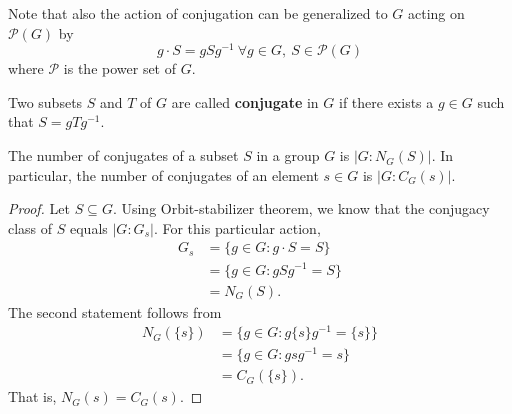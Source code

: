 Note that also the action of conjugation can be generalized to \( G  \) acting on \( \mathcal{P}(G) \) by
\[  g \cdot S = g S g^{-1} \ \forall g \in G ,\ S \in \mathcal{P}(G) \]
where \( \mathcal{P} \) is the power set of \( G \). 

\begin{definition}[Conjugate]
    Two subsets \( S  \) and \( T  \) of \( G  \) are called \textbf{conjugate} in \( G  \) if there exists a \( g \in G  \) such that \( S = g T g^{-1} \). 
\end{definition}

\begin{lemma}
The number of conjugates of a subset \( S  \) in a group \( G  \) is \( | G : {N}_{G}(S) |  \). In particular, the number of conjugates of an element \( s \in G  \) is \( | G : {C}_{G}(s) |  \).    
\end{lemma}
\begin{proof}
Let \( S \subseteq  G  \). Using Orbit-stabilizer theorem, we know that the conjugacy class of \( S  \) equals \( | G : {G}_{s} |  \). For this particular action,  
\begin{align*}
    {G}_{s} &= \{  g \in G : g \cdot S = S  \}  \\
            &= \{  g \in G : g S g^{-1} = S  \} \\
            &= {N}_{G}(S).
\end{align*}
The second statement follows from 
\begin{align*}
    {N}_{G}(\{ s \} ) &= \{  g \in G : g \{ s  \}  g^{-1} = \{ s \}  \}  \\
                      &= \{  g \in G : g s g^{-1} = s  \}  \\
                      &= {C}_{G}(\{ s \}).
\end{align*}
That is, \( {N}_{G}(s) = {C}_{G}(s) \).
\end{proof}

